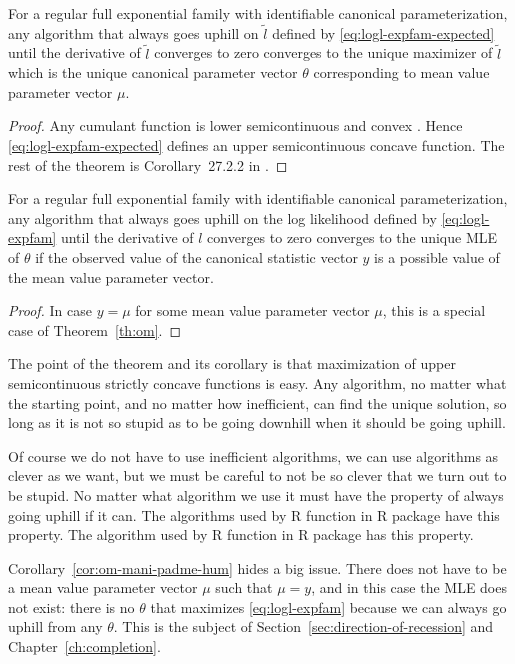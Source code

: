 \begin{theorem} \label{th:om}
For a regular full exponential family with identifiable canonical
parameterization,
any algorithm that always goes uphill on $\tilde{l}$
defined by \eqref{eq:logl-expfam-expected} until the derivative of $\tilde{l}$
converges to zero
converges to the unique maximizer of $\tilde{l}$ which is the unique
canonical parameter vector $\theta$ corresponding to mean value
parameter vector $\mu$.
\end{theorem}
\begin{proof}
Any cumulant function is lower semicontinuous and convex
\citep[Theorem~7.1]{barndorff-nielsen}.
Hence \eqref{eq:logl-expfam-expected}
defines an upper semicontinuous concave function.
The rest of the theorem is Corollary~{27.2.2} in \citep{rockafellar}.
\end{proof}
\begin{corollary} \label{cor:om-mani-padme-hum}
For a regular full exponential family with identifiable canonical
parameterization,
any algorithm that always goes uphill on the log likelihood
defined by \eqref{eq:logl-expfam} until the derivative of $l$ converges
to zero converges to the unique MLE of $\theta$ if the observed
value of the canonical statistic vector $y$ is a possible value of the
mean value parameter vector.
\end{corollary}
\begin{proof}
In case $y = \mu$ for some mean value parameter vector $\mu$,
this is a special case of Theorem~\ref{th:om}.
\end{proof}

The point of the theorem and its corollary is that maximization
of upper semicontinuous strictly concave functions is easy.
Any algorithm, no matter what the starting point,
and no matter how inefficient,
can find the unique solution,
so long as it is not so stupid as to be
going downhill when it should be going uphill.

Of course we do not have to use inefficient algorithms, we can use
algorithms as clever as we want, but we must be careful to not be so
clever that we turn out to be stupid.  No matter what algorithm we
use it must have the property of always going uphill if it can.
The algorithms used by R function  in R package 
have this property.
The algorithm used by R function  in
R package 
has this property.

Corollary~\ref{cor:om-mani-padme-hum} hides a big issue.
There does not have to be a mean value parameter vector $\mu$ such that
$\mu = y$, and in this case the MLE does not exist: there is no $\theta$
that maximizes \eqref{eq:logl-expfam} because we can always go uphill
from any $\theta$.  This is the subject
of Section~\ref{sec:direction-of-recession} and Chapter~\ref{ch:completion}.

